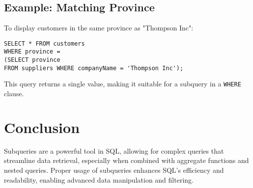\documentclass{article}
\begin{document}
\subsection{Example: Matching Province}
To display customers in the same province as "Thompson Inc":

\begin{verbatim}
SELECT * FROM customers
WHERE province = 
(SELECT province 
FROM suppliers WHERE companyName = 'Thompson Inc');
\end{verbatim}

This query returns a single value, making it suitable for a subquery in a \texttt{WHERE} clause.

\section{Conclusion}
Subqueries are a powerful tool in SQL, allowing for complex queries that streamline data retrieval, especially when combined with aggregate functions and nested queries. Proper usage of subqueries enhances SQL's efficiency and readability, enabling advanced data manipulation and filtering.
\end{document}
